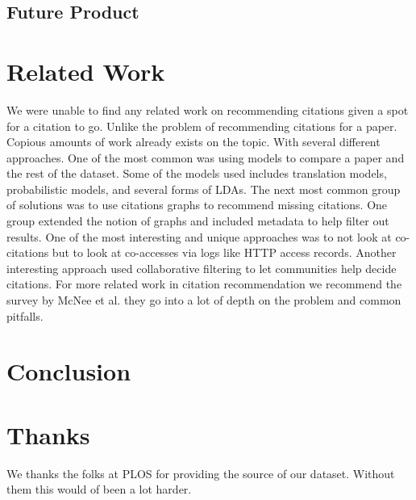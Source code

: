 \documentclass[10pt, conference, compsocconf]{IEEEtran}
\begin{document}
\subsection{Future Product}

\section{Related Work}\label{sec:related}
We were unable to find any related work on recommending citations given a spot for a citation to go. Unlike the problem of recommending citations for a paper. Copious amounts of work already exists on the topic. With several different approaches. One of the most common was using models to compare a paper and the rest of the dataset. Some of the models used includes translation models, probabilistic models, and several forms of LDAs.\cite{cite1, cite2, cite3} The next most common group of solutions was to use citations graphs to recommend missing citations.\cite{cite6} One group extended the notion of graphs and included metadata to help filter out results.\cite{cite4} One of the most 
interesting and unique approaches was to not look at co-citations but to look at co-accesses via logs like HTTP access records.\cite{cite7}
Another interesting approach used collaborative filtering to let communities help decide citations.\cite{cite8} For more related work in
citation recommendation we recommend the survey by McNee et al. they go into a lot of depth on the problem and common pitfalls.\cite{cite5}

\section{Conclusion}\label{sec:conclusion}

\section{Thanks}
We thanks the folks at PLOS for providing the source of our dataset. Without them this would of been a lot harder.



\end{document}
